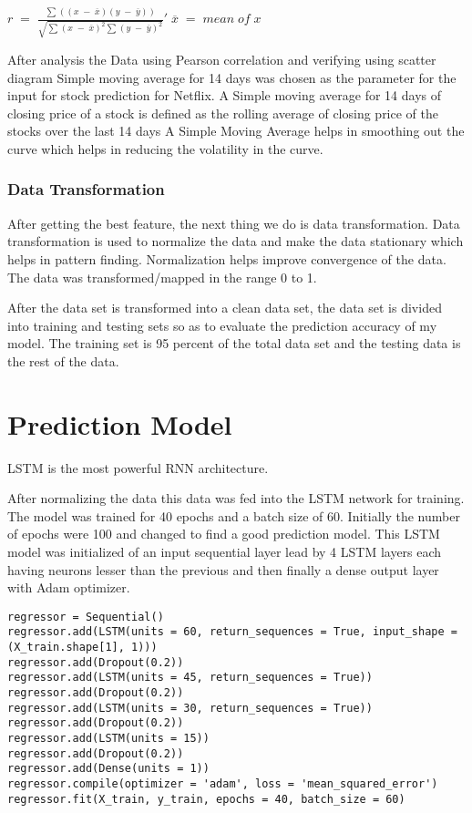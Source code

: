 \documentclass[5p,,preprint,12pt,twocolumn]{elsarticle}
\begin{document}
$r\;=\;\frac{\sum_{}((x\;-\;\overline x)(y\;-\;\overline y))}{\sqrt{{\displaystyle\sum_{}}(x\;-\;\overline x)^{2}{\displaystyle\sum_{}}(y\;-\;\overline y)^{2}}}'\;\overline x\;=\;mean\;of\;x $

After analysis the Data using Pearson correlation and verifying using scatter diagram Simple moving average for 14 days was chosen as the parameter for the input for stock prediction for Netflix.  A Simple moving average for 14 days of closing price of a stock is defined as the rolling average of closing price of the stocks over the last 14 days A Simple Moving Average helps in smoothing out the curve which helps in reducing the volatility in the curve.



\subsubsection{Data Transformation}After getting the best feature, the next thing we do is data transformation. Data transformation is used to normalize the data and make the data stationary which helps in pattern finding. Normalization helps improve convergence of the data. The data was transformed/mapped in the range 0 to 1.

After the data set is transformed into a clean data set, the data set is divided into training and testing sets so as to evaluate the prediction accuracy of my model. The training set is 95 percent of the total data set and the testing data is the rest of the data.
    
\section{Prediction Model}
LSTM is the most powerful RNN architecture. 

After normalizing the data this data was fed into the LSTM network for training. The model was trained for 40 epochs and a batch size of 60. Initially the number of epochs were 100 and changed to find a good prediction model. This LSTM model was initialized of an input sequential layer lead by 4 LSTM layers each having neurons lesser than the previous and then finally a dense output layer with Adam optimizer.


\begin{lstlisting}[style=listing_style,caption={Code for LSTM Neural Network}]
regressor = Sequential()
regressor.add(LSTM(units = 60, return_sequences = True, input_shape = (X_train.shape[1], 1)))
regressor.add(Dropout(0.2))
regressor.add(LSTM(units = 45, return_sequences = True))
regressor.add(Dropout(0.2))
regressor.add(LSTM(units = 30, return_sequences = True))
regressor.add(Dropout(0.2))
regressor.add(LSTM(units = 15))
regressor.add(Dropout(0.2))
regressor.add(Dense(units = 1)) 
regressor.compile(optimizer = 'adam', loss = 'mean_squared_error')
regressor.fit(X_train, y_train, epochs = 40, batch_size = 60)

\end{lstlisting}
\end{document}
